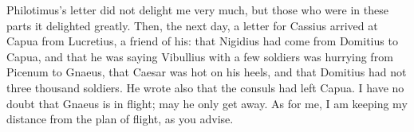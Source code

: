 

 Philotimus's letter did not delight me very much, but those who were in these parts it delighted greatly. Then, the next day, a letter for Cassius arrived at Capua from Lucretius, a friend of his: that Nigidius had come from Domitius to Capua, and that he was saying Vibullius with a few soldiers was hurrying from Picenum to Gnaeus, that Caesar was hot on his heels, and that Domitius had not three thousand soldiers. He wrote also that the consuls had left Capua. I have no doubt that Gnaeus is in flight; may he only get away. As for me, I am keeping my distance from the plan of flight, as you advise.
